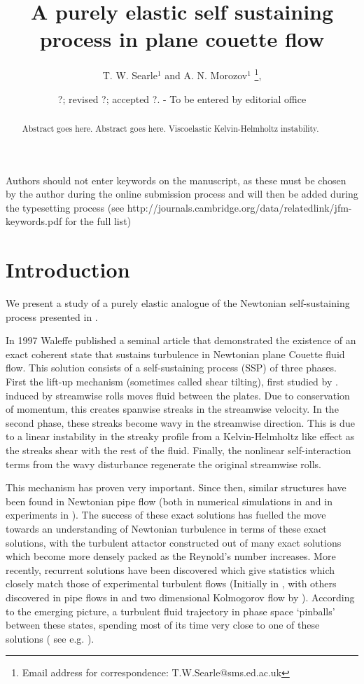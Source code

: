 \documentclass{jfm}
\title[A purely elastic self sustaining process in plane couette flow]{A purely elastic self sustaining process in plane couette flow}
\author[T. W. Searle and A. N. Morozov]%
{T. W. Searle$^1$ and A. N. Morozov$^1$%
  \thanks{Email address for correspondence: T.W.Searle@sms.ed.ac.uk},\ns
}
\affiliation{$^1$SUPA, School of Physics and Astronomy, University of Edinburgh, Mayfield Road,
Edinburgh, EH9 3JZ, UK\\[\affilskip]
}
\date{?; revised ?; accepted ?. - To be entered by editorial office}
\begin{document}
\maketitle

\begin{abstract}
  Abstract goes here. Abstract goes here. Viscoelastic Kelvin-Helmholtz instability. 
\end{abstract}

\begin{keywords}
Authors should not enter keywords on the manuscript, as these must be chosen by
the author during the online submission process and will then be added during
the typesetting process (see
http://journals.cambridge.org/data/\linebreak[3]relatedlink/jfm-\linebreak[3]keywords.pdf
for the full list)
\end{keywords}

\section{Introduction}\label{sec:intro}

We present a study of a purely elastic analogue of the Newtonian
self-sustaining process presented in \cite{Waleffe1997}.

In 1997 Waleffe published a seminal article that demonstrated the existence of
an exact coherent state that sustains turbulence in Newtonian plane Couette
fluid flow. This solution consists of a self-sustaining process (SSP) of three
phases. First the lift-up mechanism (sometimes called shear tilting), first
studied by \cite{Ellingsen1975, Landahl1980}.  induced by streamwise rolls
moves fluid between the plates. Due to conservation of momentum, this creates
spanwise streaks in the streamwise velocity. In the second phase, these streaks
become wavy in the streamwise direction. This is due to a linear instability in
the streaky profile from a Kelvin-Helmholtz like effect as the streaks shear
with the rest of the fluid. Finally, the nonlinear self-interaction terms from
the wavy disturbance regenerate the original streamwise rolls.

This mechanism has proven very important. Since then, similar structures have
been found in Newtonian pipe flow (both in numerical simulations in
\cite{Wedin2004} and in experiments in \cite{Hof2004}). The success of these
exact solutions has fuelled the move towards an understanding of Newtonian
turbulence in terms of these exact solutions, with the turbulent attactor
constructed out of many exact solutions which become more densely packed as the
Reynold's number increases. More recently, recurrent solutions have been
discovered which give statistics which closely match those of experimental
turbulent flows (Initially in \cite{Kawahara2001}, with others discovered in
pipe flows in \cite{Kreilos2012} and two dimensional Kolmogorov flow by
\cite{Chandler2013}). According to the emerging picture, a turbulent fluid
trajectory in phase space `pinballs' between these states, spending most of its
time very close to one of these solutions ( see e.g. \cite{Cvitanovic2013}).
\end{document}
